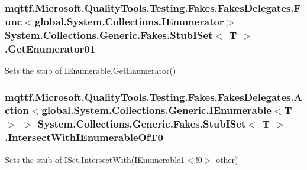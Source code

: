 \hypertarget{class_system_1_1_collections_1_1_generic_1_1_fakes_1_1_stub_i_set_3_01_t_01_4_a1e0b8a49106b78c804080a26bb61c9ab}{
\subsubsection[{Get\-Enumerator01}]{\setlength{\rightskip}{0pt plus 5cm}mqttf.\-Microsoft.\-Quality\-Tools.\-Testing.\-Fakes.\-Fakes\-Delegates.\-Func$<$global.\-System.\-Collections.\-I\-Enumerator$>$ System.\-Collections.\-Generic.\-Fakes.\-Stub\-I\-Set$<$ T $>$.Get\-Enumerator01}}\label{class_system_1_1_collections_1_1_generic_1_1_fakes_1_1_stub_i_set_3_01_t_01_4_a1e0b8a49106b78c804080a26bb61c9ab}


Sets the stub of I\-Enumerable.\-Get\-Enumerator()

\hypertarget{class_system_1_1_collections_1_1_generic_1_1_fakes_1_1_stub_i_set_3_01_t_01_4_ac9bce9225513be35e85a66d7733f45f6}{
\subsubsection[{Intersect\-With\-I\-Enumerable\-Of\-T0}]{\setlength{\rightskip}{0pt plus 5cm}mqttf.\-Microsoft.\-Quality\-Tools.\-Testing.\-Fakes.\-Fakes\-Delegates.\-Action$<$global.\-System.\-Collections.\-Generic.\-I\-Enumerable$<$T$>$ $>$ System.\-Collections.\-Generic.\-Fakes.\-Stub\-I\-Set$<$ T $>$.Intersect\-With\-I\-Enumerable\-Of\-T0}}\label{class_system_1_1_collections_1_1_generic_1_1_fakes_1_1_stub_i_set_3_01_t_01_4_ac9bce9225513be35e85a66d7733f45f6}


Sets the stub of I\-Set{.\-Intersect\-With(I\-Enumerable}1$<$!0$>$ other)

